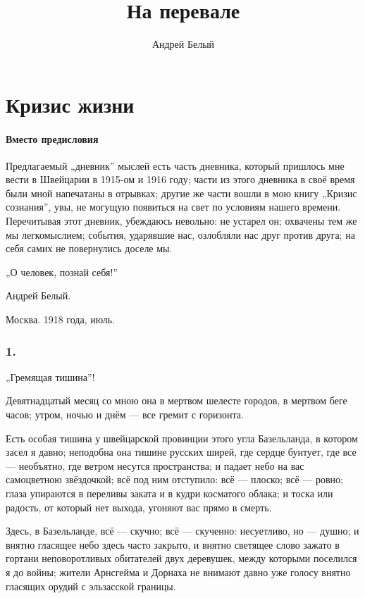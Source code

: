 \documentclass[12pt,a4paper,oneside]{book}
\begin{document}
\title{На перевале}
\author{Андрей Белый}
\date{}
\maketitle

\tableofcontents

\part{Кризис жизни}

\subsection{Вместо предисловия}
Предлагаемый „дневник” мыслей есть часть дневника, который пришлось мне вести в Швейцарии в 1915-ом и 1916 году; части из этого дневника в своё время были мной напечатаны в отрывках; другие же части вошли в мою книгу „Кризис сознания”, увы, не могущую появиться на свет по условиям нашего времени. Перечитывая этот дневник, убеждаюсь невольно: не устарел он; охвачены тем же мы легкомыслием; события, ударявшие нас, озлобляли нас друг против друга; на себя самих не повернулись доселе мы.

„О человек, познай себя!”

\begin{flushright}Андрей Белый.\end{flushright}

Москва. 1918 года, июль.

\section*{1.}

„Гремящая тишина”!

Девятнадцатый месяц со мною она в мертвом шелесте городов, в мертвом беге часов; утром, ночью и днём — все гремит с горизонта.

Есть особая тишина у швейцарской провинции этого угла Базельланда, в котором засел я давно; неподобна она тишине русских ширей, где сердце бунтует, где все — необъятно, где ветром несутся пространства; и падает небо на вас самоцветною звёздочкой; всё под ним отступило: всё — плоско; всё — ровно; глаза упираются в переливы заката и в кудри косматого облака; и тоска или радость, от который нет выхода, угоняют вас прямо в смерть.

Здесь, в Базельланде, всё — скучно; всё — скученно: несуетливо, но — душно; и внятно гласящее небо здесь часто закрыто, и внятно светящее слово зажато в гортани неповоротливых обитателей двух деревушек, между которыми поселился я до войны; жители Арнсгейма и Дорнаха не внимают давно уже голосу внятно гласящих орудий с эльзасской границы.
\end{document}
